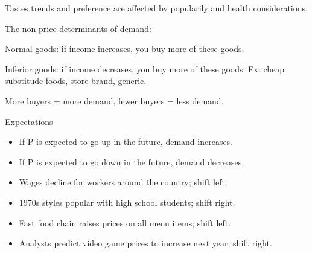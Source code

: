 \documentclass{scrreprt} %
\begin{document}
Tastes trends and preference are affected by popularily and health considerations.

The non-price determinants of demand:

\begin{definition}
	Normal goods: if income increases, you buy more of these goods.

	Inferior goods: if income decreases, you buy more of these goods. Ex: 
	cheap substitude foods, store brand, generic.
\end{definition}

More buyers = more demand, fewer buyers = less demand.

Expectations

\begin{itemize}
	\item If P is expected to go up in the future, demand increases.
	\item If P is expected to go down in the future, demand decreases.
\end{itemize}

\begin{example}
	\begin{itemize}
		\item Wages decline for workers around the country; shift left.
		\item 1970s styles popular with high school students; shift right.
		\item Fast food chain raises prices on all menu items; shift left.
		\item Analysts predict video game prices to increase next year; shift right.
	\end{itemize}
\end{example}
\end{document}
